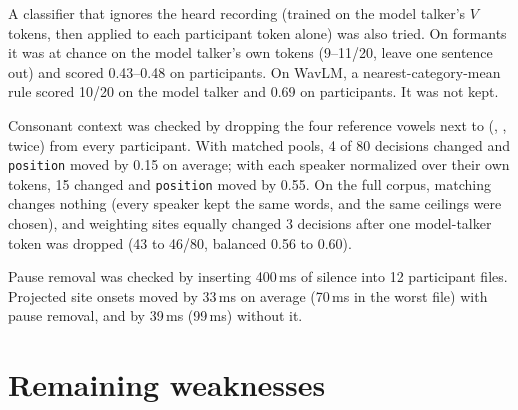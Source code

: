 \documentclass[11pt]{article}
\begin{document}
A classifier that ignores the heard recording (trained on the model talker's $V$ tokens, then applied to each participant token alone) was also tried. On formants it was at chance on the model talker's own tokens (9--11/20, leave one sentence out) and scored 0.43--0.48 on participants. On WavLM, a nearest-category-mean rule scored 10/20 on the model talker and 0.69 on participants. It was not kept.

Consonant context was checked by dropping the four reference vowels next to  (\textipa{[Ka]}, \textipa{[ZaK]}, \textipa{[Ki]} twice) from every participant. With matched pools, 4 of 80 decisions changed and \texttt{position} moved by 0.15 on average; with each speaker normalized over their own tokens, 15 changed and \texttt{position} moved by 0.55. On the full corpus, matching changes nothing (every speaker kept the same words, and the same ceilings were chosen), and weighting sites equally changed 3 decisions after one model-talker token was dropped (43 to 46/80, balanced 0.56 to 0.60).

Pause removal was checked by inserting 400\,ms of silence into 12 participant files. Projected site onsets moved by 33\,ms on average (70\,ms in the worst file) with pause removal, and by 39\,ms (99\,ms) without it.

\section{Remaining weaknesses}
\end{document}
